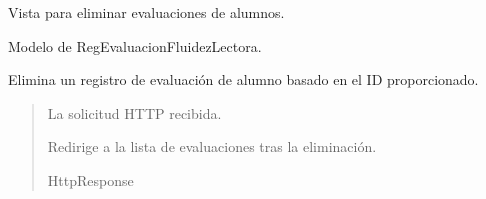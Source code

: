\documentclass[letterpaper,10pt,spanish]{sphinxmanual}
\begin{document}
\begin{fulllineitems}

\pysigstartsignatures
{}
\pysigstopsignatures

\begin{fulllineitems}

\pysigstartsignatures
{}
\pysigstopsignatures
\end{fulllineitems}


\end{fulllineitems}



\begin{fulllineitems}

\pysigstartsignatures
{}
\pysigstopsignatures
\sphinxAtStartPar
Vista para eliminar evaluaciones de alumnos.


\begin{fulllineitems}

\pysigstartsignatures
{}
\pysigstopsignatures
\sphinxAtStartPar
Modelo de RegEvaluacionFluidezLectora.

\end{fulllineitems}



\begin{fulllineitems}

\pysigstartsignatures
{}
\pysigstopsignatures
\sphinxAtStartPar
Elimina un registro de evaluación de alumno basado en el ID proporcionado.
\begin{quote}\begin{description}
\sphinxAtStartPar
{} \textendash{} La solicitud HTTP recibida.

\sphinxAtStartPar
Redirige a la lista de evaluaciones tras la eliminación.

\sphinxAtStartPar
HttpResponse

\end{description}\end{quote}

\end{fulllineitems}


\end{fulllineitems}
\end{document}
